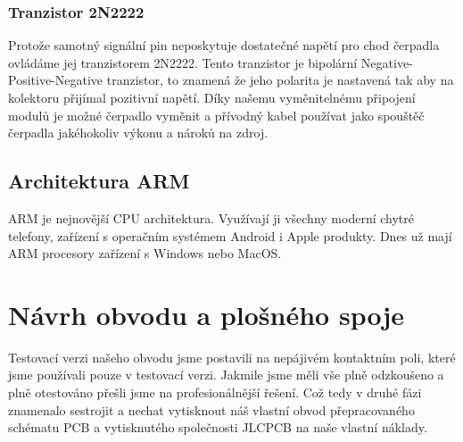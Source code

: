 \documentclass[12pt,a4paper]{article}
\begin{document}
\subsubsection{Tranzistor 2N2222}

Protože samotný signální pin neposkytuje dostatečné napětí pro chod čerpadla
ovládáme jej tranzistorem 2N2222. Tento tranzistor je bipolární
Negative-Positive-Negative tranzistor, to znamená že jeho polarita je nastavená
tak aby na kolektoru přijímal pozitivní napětí. Díky našemu vyměnitelnému
připojení modulů je
možné čerpadlo vyměnit a přívodný kabel používat jako spouštěč čerpadla
jakéhokoliv výkonu a nároků na zdroj.

\subsection{Architektura ARM}

\ac{ARM} je nejnovější \ac{CPU} architektura. Využívají ji všechny moderní
chytré
telefony, zařízení s operačním systémem Android i Apple produkty. Dnes už mají
\ac{ARM} procesory zařízení s Windows nebo MacOS.\@


\clearpage

\section{Návrh obvodu a plošného spoje}

Testovací verzi našeho obvodu jsme postavili na nepájivém kontaktním poli,
které jsme používali pouze v testovací verzi. Jakmile jsme měli vše plně
odzkoušeno a plně otestováno přešli jsme na profesionálnější řešení.
Což tedy v druhé fázi znamenalo sestrojit a nechat vytisknout náš vlastní obvod
přepracovaného schématu \ac{PCB} a vytisknutého společnosti JLCPCB na naše
vlastní
náklady.
\end{document}
